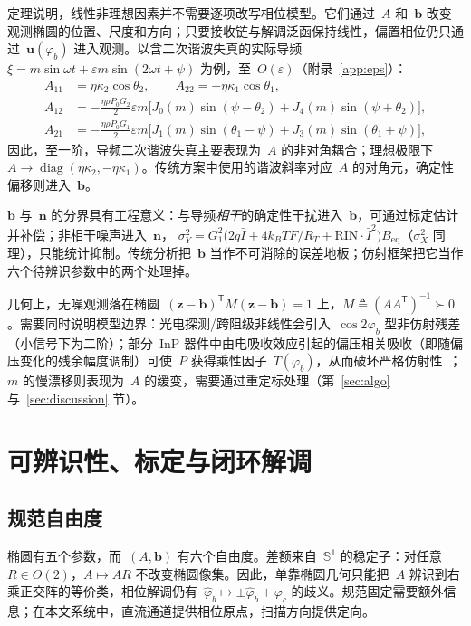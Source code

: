 \documentclass[11pt,journal,onecolumn]{IEEEtran}
\theoremstyle{plain}
\theoremstyle{remark}
\newcommand{\zv}{\mathbf{z}}
\newcommand{\uv}{\mathbf{u}}
\newcommand{\bv}{\mathbf{b}}
\newcommand{\nv}{\mathbf{n}}
\newcommand{\T}{\mathsf{T}}
\begin{document}
定理说明，线性非理想因素并不需要逐项改写相位模型。它们通过~$A$ 和~$\bv$ 改变观测椭圆的位置、尺度和方向；只要接收链与解调泛函保持线性，偏置相位仍只通过~$\uv(\varphi_b)$ 进入观测。以含二次谐波失真的实际导频~$\xi=m\sin\omega t+\varepsilon m\sin(2\omega t+\psi)$ 为例，至~$O(\varepsilon)$（附录~\ref{app:eps}）：
\begin{align}
A_{11}&=\eta\kappa_2\cos\theta_2, \qquad A_{22}=-\eta\kappa_1\cos\theta_1,\nonumber\\
A_{12}&=-\tfrac{\eta\rho P_0G_2}{2}\varepsilon m
\bigl[J_0(m)\sin(\psi{-}\theta_2)+J_4(m)\sin(\psi{+}\theta_2)\bigr],\nonumber\\
A_{21}&=-\tfrac{\eta\rho P_0G_1}{2}\varepsilon m
\bigl[J_1(m)\sin(\theta_1{-}\psi)+J_3(m)\sin(\theta_1{+}\psi)\bigr],
\label{eq:Aeps}
\end{align}
因此，至一阶，导频二次谐波失真主要表现为~$A$ 的非对角耦合；理想极限下~$A\to\operatorname{diag}(\eta\kappa_2,-\eta\kappa_1)$。传统方案中使用的谐波斜率对应~$A$ 的对角元，确定性偏移则进入~$\bv$。

$\bv$ 与~$\nv$ 的分界具有工程意义：与导频\emph{相干}的确定性干扰进入~$\bv$，可通过标定估计并补偿；非相干噪声进入~$\nv$，
$\sigma_Y^2=G_1^2\bigl(2q\bar I+4k_BTF/R_T+\mathrm{RIN}\cdot\bar I^2\bigr)B_{\mathrm{eq}}$（$\sigma_X^2$ 同理），只能统计抑制。传统分析把~$\bv$ 当作不可消除的误差地板；仿射框架把它当作六个待辨识参数中的两个处理掉。

几何上，无噪观测落在椭圆~$(\zv-\bv)^{\T}M(\zv-\bv)=1$ 上，$M\triangleq(AA^{\T})^{-1}\succ0$。需要同时说明模型边界：光电探测/跨阻级非线性会引入~$\cos 2\varphi_b$ 型非仿射残差（小信号下为二阶）；部分~InP 器件中由电吸收效应引起的偏压相关吸收（即随偏压变化的残余幅度调制）可使~$P$ 获得乘性因子~$T(\varphi_b)$，从而破坏严格仿射性~\cite{chen2011}；$m$ 的慢漂移则表现为~$A$ 的缓变，需要通过重定标处理（第~\ref{sec:algo} 与~\ref{sec:discussion} 节）。

\section{可辨识性、标定与闭环解调}
\label{sec:calib}

\subsection{规范自由度}
椭圆有五个参数，而~$(A,\bv)$ 有六个自由度。差额来自~$\mathbb{S}^1$ 的稳定子：对任意~$R\in O(2)$，$A\mapsto AR$ 不改变椭圆像集。因此，单靠椭圆几何只能把~$A$ 辨识到右乘正交阵的等价类，相位解调仍有~$\hat\varphi_b\mapsto\pm\hat\varphi_b+\varphi_c$ 的歧义。规范固定需要额外信息；在本文系统中，直流通道提供相位原点，扫描方向提供定向。
\end{document}
